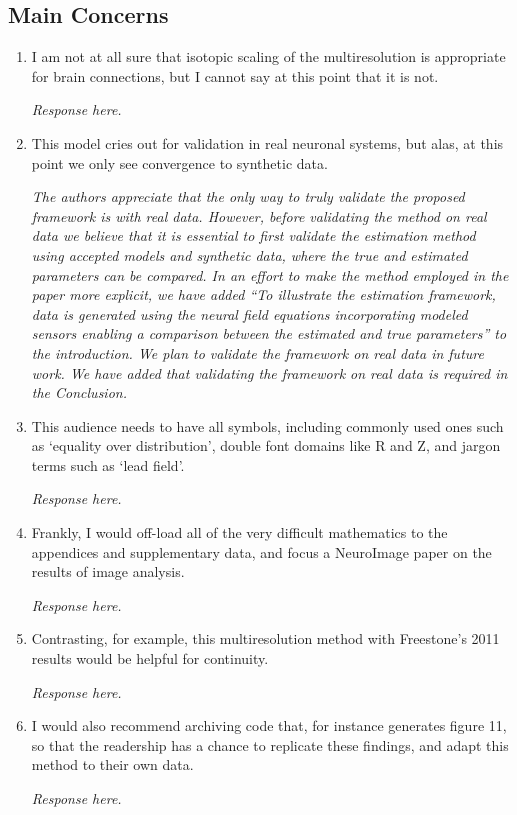 \documentclass{article}
\begin{document}
    \subsection{Main Concerns}
		\begin{enumerate} 
			\item I am not at all sure that isotopic scaling of the multiresolution is appropriate for brain connections, but I cannot say at this point that it is not.
			
			\emph{Response here.}
			 
			\item This model cries out for validation in real neuronal systems, but alas, at this point we only see convergence to synthetic data.   
			
			\emph{The authors appreciate that the only way to truly validate the proposed framework is with real data. However, before validating the method on real data we believe that it is essential to first validate the estimation method using accepted models and synthetic data, where the true and estimated parameters can be compared. In an effort to make the method employed in the paper more explicit, we have added ``To illustrate the estimation framework, data is generated using the neural field equations incorporating modeled sensors enabling a comparison between the estimated and true parameters'' to the introduction. We plan to validate the framework on real data in future work. We have added that validating the framework on real data is required in the Conclusion.}  
			
			\item This audience needs to have all symbols, including commonly used ones such as `equality over distribution', double font domains like R and Z, and jargon terms such as `lead field'.
			
			\emph{Response here.}  
			
			\item Frankly, I would off-load all of the very difficult mathematics to the appendices and supplementary data, and focus a NeuroImage paper on the results of image analysis. 
			
			\emph{Response here.}
			
			\item Contrasting, for example, this multiresolution method with Freestone's 2011 results would be helpful for continuity.
			
			\emph{Response here.}
			
			\item I would also recommend archiving code that, for instance generates figure 11, so that the readership has a chance to replicate these findings, and adapt this method to their own data.
			
 			\emph{Response here.}
 		
			                                       
			\end{enumerate}  
\end{document}
